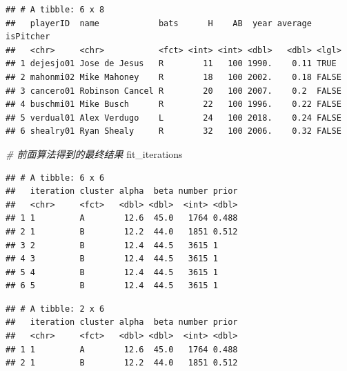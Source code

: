 \documentclass[]{book}
\newenvironment{Shaded}{\begin{snugshade}}{\end{snugshade}}
\newcommand{\CommentTok}[1]{\textcolor[rgb]{0.56,0.35,0.01}{\textit{#1}}}
\newcommand{\DecValTok}[1]{\textcolor[rgb]{0.00,0.00,0.81}{#1}}
\newcommand{\KeywordTok}[1]{\textcolor[rgb]{0.13,0.29,0.53}{\textbf{#1}}}
\newcommand{\NormalTok}[1]{#1}
\newcommand{\OperatorTok}[1]{\textcolor[rgb]{0.81,0.36,0.00}{\textbf{#1}}}
\newcommand{\StringTok}[1]{\textcolor[rgb]{0.31,0.60,0.02}{#1}}
\begin{document}
\begin{verbatim}
## # A tibble: 6 x 8
##   playerID  name            bats      H    AB  year average isPitcher
##   <chr>     <chr>           <fct> <int> <int> <dbl>   <dbl> <lgl>    
## 1 dejesjo01 Jose de Jesus   R        11   100 1990.    0.11 TRUE     
## 2 mahonmi02 Mike Mahoney    R        18   100 2002.    0.18 FALSE    
## 3 cancero01 Robinson Cancel R        20   100 2007.    0.2  FALSE    
## 4 buschmi01 Mike Busch      R        22   100 1996.    0.22 FALSE    
## 5 verdual01 Alex Verdugo    L        24   100 2018.    0.24 FALSE    
## 6 shealry01 Ryan Shealy     R        32   100 2006.    0.32 FALSE
\end{verbatim}

\begin{Shaded}
\begin{Highlighting}[]
\CommentTok{# 前面算法得到的最终结果}
\NormalTok{fit_iterations}
\end{Highlighting}
\end{Shaded}

\begin{verbatim}
## # A tibble: 6 x 6
##   iteration cluster alpha  beta number prior
##   <chr>     <fct>   <dbl> <dbl>  <int> <dbl>
## 1 1         A        12.6  45.0   1764 0.488
## 2 1         B        12.2  44.0   1851 0.512
## 3 2         B        12.4  44.5   3615 1    
## 4 3         B        12.4  44.5   3615 1    
## 5 4         B        12.4  44.5   3615 1    
## 6 5         B        12.4  44.5   3615 1
\end{verbatim}

\begin{Shaded}
\end{Shaded}

\begin{verbatim}
## # A tibble: 2 x 6
##   iteration cluster alpha  beta number prior
##   <chr>     <fct>   <dbl> <dbl>  <int> <dbl>
## 1 1         A        12.6  45.0   1764 0.488
## 2 1         B        12.2  44.0   1851 0.512
\end{verbatim}
\end{document}
